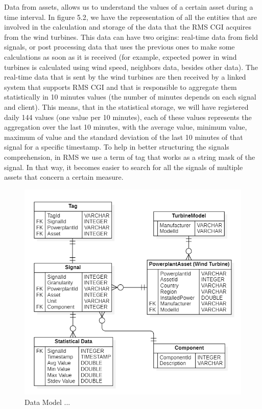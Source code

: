 Data from assets, allows us to understand the values of a certain asset during a time interval. In figure 5.2, we have the representation of all the entities that are involved in the calculation and storage of the data that the RMS CGI acquires from the wind turbines.
This data can have two origins: real-time data from field signals, or post processing data that uses the previous ones to make some calculations as soon as it is received (for example, expected power in wind turbines is calculated using wind speed, neighbors data, besides other data).
The real-time data that is sent by the wind turbines are then received by a linked system that supports RMS CGI and that is responsible to aggregate them statistically in 10 minutes values (the number of minutes depends on each signal and client). This means, that in the statistical storage, we will have registered daily 144 values (one value per 10 minutes), each of these values represents the aggregation over the last 10 minutes, with the average value, minimum value, maximum of value and the standard deviation of the last 10 minutes of that signal for a specific timestamp.
To help in better structuring the signals comprehension, in RMS we use a term of tag that works as a string mask of the signal. In that way, it becomes easier to search for all the signals of multiple assets that concern a certain measure.

\begin{figure}[htbp]
	\centering
	\includegraphics[scale=0.7]{Chapters/Figures/methodology_fig11.png}
	\caption{Data Model ...}
	\label{fig:Figuras_Tree_silhouettes-vectorial}
\end{figure}


